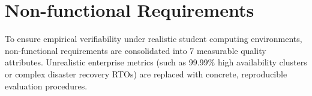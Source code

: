 \endgroup







\section{Non-functional Requirements}

\label{sec:non-functional-requirements}



To ensure empirical verifiability under realistic student computing environments, non-functional requirements are consolidated into 7 measurable quality attributes. Unrealistic enterprise metrics (such as 99.99\% high availability clusters or complex disaster recovery RTOs) are replaced with concrete, reproducible evaluation procedures.



\begingroup

\small

\setlength{\tabcolsep}{5pt}

\renewcommand{\arraystretch}{1.2}

